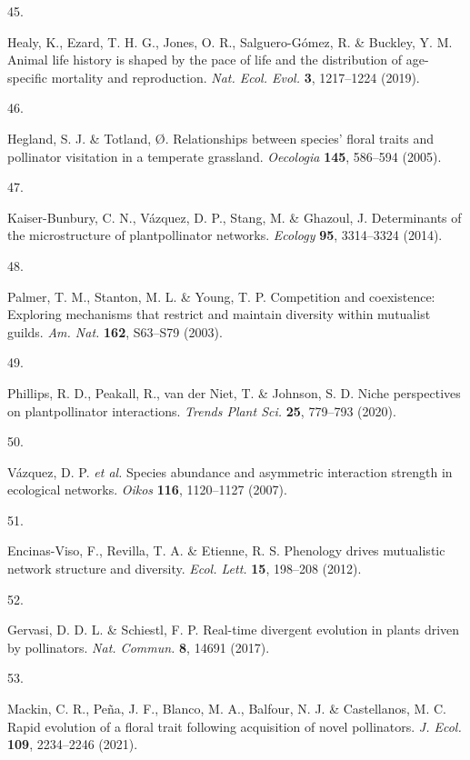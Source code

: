 \documentclass[
  12pt,
  a4paper,
]{article}
\newlength{\cslhangindent}
\newlength{\csllabelwidth}
\newlength{\cslentryspacingunit} %
\newenvironment{CSLReferences}[2] %
 {%
  \setlength{\parindent}{0pt}
  \ifodd #1
  \let\oldpar\par
  \def\par{\hangindent=\cslhangindent\oldpar}
  \fi
  \setlength{\parskip}{#2\cslentryspacingunit}
 }%
 {}
\newcommand{\CSLLeftMargin}[1]{\parbox[t]{\csllabelwidth}{#1}}
\newcommand{\CSLRightInline}[1]{\parbox[t]{\linewidth - \csllabelwidth}{#1}\break}
\begin{document}
\begin{CSLReferences}{0}{0}
\leavevmode{}%
\CSLLeftMargin{45. }
\CSLRightInline{Healy, K., Ezard, T. H. G., Jones, O. R., Salguero-Gómez, R. \& Buckley, Y. M. Animal life history is shaped by the pace of life and the distribution of age-specific mortality and reproduction. \emph{Nat. Ecol. Evol.} \textbf{3}, 1217--1224 (2019).}

\leavevmode{}%
\CSLLeftMargin{46. }
\CSLRightInline{Hegland, S. J. \& Totland, Ø. Relationships between species' floral traits and pollinator visitation in a temperate grassland. \emph{Oecologia} \textbf{145}, 586--594 (2005).}

\leavevmode{}%
\CSLLeftMargin{47. }
\CSLRightInline{Kaiser-Bunbury, C. N., Vázquez, D. P., Stang, M. \& Ghazoul, J. Determinants of the microstructure of plant\textendash pollinator networks. \emph{Ecology} \textbf{95}, 3314--3324 (2014).}

\leavevmode{}%
\CSLLeftMargin{48. }
\CSLRightInline{Palmer, T. M., Stanton, M. L. \& Young, T. P. Competition and coexistence: Exploring mechanisms that restrict and maintain diversity within mutualist guilds. \emph{Am. Nat.} \textbf{162}, S63--S79 (2003).}

\leavevmode{}%
\CSLLeftMargin{49. }
\CSLRightInline{Phillips, R. D., Peakall, R., van der Niet, T. \& Johnson, S. D. Niche perspectives on plant\textendash pollinator interactions. \emph{Trends Plant Sci.} \textbf{25}, 779--793 (2020).}

\leavevmode{}%
\CSLLeftMargin{50. }
\CSLRightInline{Vázquez, D. P. \emph{et al.} Species abundance and asymmetric interaction strength in ecological networks. \emph{Oikos} \textbf{116}, 1120--1127 (2007).}

\leavevmode{}%
\CSLLeftMargin{51. }
\CSLRightInline{Encinas-Viso, F., Revilla, T. A. \& Etienne, R. S. Phenology drives mutualistic network structure and diversity. \emph{Ecol. Lett.} \textbf{15}, 198--208 (2012).}

\leavevmode{}%
\CSLLeftMargin{52. }
\CSLRightInline{Gervasi, D. D. L. \& Schiestl, F. P. Real-time divergent evolution in plants driven by pollinators. \emph{Nat. Commun.} \textbf{8}, 14691 (2017).}

\leavevmode{}%
\CSLLeftMargin{53. }
\CSLRightInline{Mackin, C. R., Peña, J. F., Blanco, M. A., Balfour, N. J. \& Castellanos, M. C. Rapid evolution of a floral trait following acquisition of novel pollinators. \emph{J. Ecol.} \textbf{109}, 2234--2246 (2021).}


\end{CSLReferences}
\end{document}
